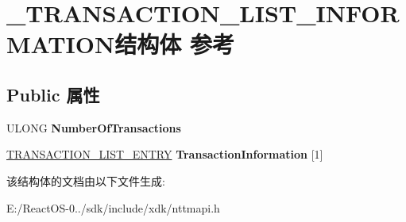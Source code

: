 \hypertarget{struct___t_r_a_n_s_a_c_t_i_o_n___l_i_s_t___i_n_f_o_r_m_a_t_i_o_n}{}\section{\+\_\+\+T\+R\+A\+N\+S\+A\+C\+T\+I\+O\+N\+\_\+\+L\+I\+S\+T\+\_\+\+I\+N\+F\+O\+R\+M\+A\+T\+I\+O\+N结构体 参考}
\label{struct___t_r_a_n_s_a_c_t_i_o_n___l_i_s_t___i_n_f_o_r_m_a_t_i_o_n}
\subsection*{Public 属性}
\begin{DoxyCompactItemize}
\item 
\mbox{\label{struct___t_r_a_n_s_a_c_t_i_o_n___l_i_s_t___i_n_f_o_r_m_a_t_i_o_n_a57b5c3267d92b27f40f300fa61b2c65f}} 
U\+L\+O\+NG {\bfseries Number\+Of\+Transactions}
\item 
\mbox{\label{struct___t_r_a_n_s_a_c_t_i_o_n___l_i_s_t___i_n_f_o_r_m_a_t_i_o_n_a2793c211c0162bdb7c95c9a0bf4de580}} 
\hyperlink{struct___t_r_a_n_s_a_c_t_i_o_n___l_i_s_t___e_n_t_r_y}{T\+R\+A\+N\+S\+A\+C\+T\+I\+O\+N\+\_\+\+L\+I\+S\+T\+\_\+\+E\+N\+T\+RY} {\bfseries Transaction\+Information} \mbox{[}1\mbox{]}
\end{DoxyCompactItemize}


该结构体的文档由以下文件生成\+:\begin{DoxyCompactItemize}
\item 
E\+:/\+React\+O\+S-\/0../sdk/include/xdk/nttmapi.\+h\end{DoxyCompactItemize}
